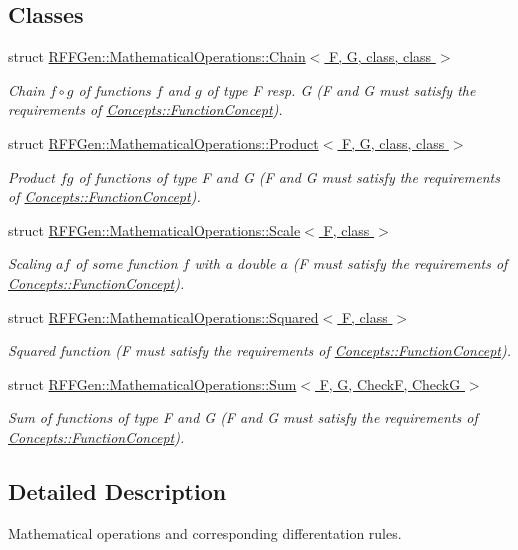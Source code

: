 \subsection*{Classes}
\begin{DoxyCompactItemize}
\item 
struct \hyperlink{structRFFGen_1_1MathematicalOperations_1_1Chain}{R\-F\-F\-Gen\-::\-Mathematical\-Operations\-::\-Chain$<$ F, G, class, class $>$}
\begin{DoxyCompactList}\small\item\em Chain $ f\circ g $ of functions $f$ and $g$ of type F resp. G (F and G must satisfy the requirements of \hyperlink{structRFFGen_1_1Concepts_1_1FunctionConcept}{Concepts\-::\-Function\-Concept}). \end{DoxyCompactList}\item 
struct \hyperlink{structRFFGen_1_1MathematicalOperations_1_1Product}{R\-F\-F\-Gen\-::\-Mathematical\-Operations\-::\-Product$<$ F, G, class, class $>$}
\begin{DoxyCompactList}\small\item\em Product $fg$ of functions of type F and G (F and G must satisfy the requirements of \hyperlink{structRFFGen_1_1Concepts_1_1FunctionConcept}{Concepts\-::\-Function\-Concept}). \end{DoxyCompactList}\item 
struct \hyperlink{structRFFGen_1_1MathematicalOperations_1_1Scale}{R\-F\-F\-Gen\-::\-Mathematical\-Operations\-::\-Scale$<$ F, class $>$}
\begin{DoxyCompactList}\small\item\em Scaling $ af $ of some function $ f $ with a double $ a $ (F must satisfy the requirements of \hyperlink{structRFFGen_1_1Concepts_1_1FunctionConcept}{Concepts\-::\-Function\-Concept}). \end{DoxyCompactList}\item 
struct \hyperlink{structRFFGen_1_1MathematicalOperations_1_1Squared}{R\-F\-F\-Gen\-::\-Mathematical\-Operations\-::\-Squared$<$ F, class $>$}
\begin{DoxyCompactList}\small\item\em Squared function (F must satisfy the requirements of \hyperlink{structRFFGen_1_1Concepts_1_1FunctionConcept}{Concepts\-::\-Function\-Concept}). \end{DoxyCompactList}\item 
struct \hyperlink{structRFFGen_1_1MathematicalOperations_1_1Sum}{R\-F\-F\-Gen\-::\-Mathematical\-Operations\-::\-Sum$<$ F, G, Check\-F, Check\-G $>$}
\begin{DoxyCompactList}\small\item\em Sum of functions of type F and G (F and G must satisfy the requirements of \hyperlink{structRFFGen_1_1Concepts_1_1FunctionConcept}{Concepts\-::\-Function\-Concept}). \end{DoxyCompactList}\end{DoxyCompactItemize}


\subsection{Detailed Description}
Mathematical operations and corresponding differentation rules. 